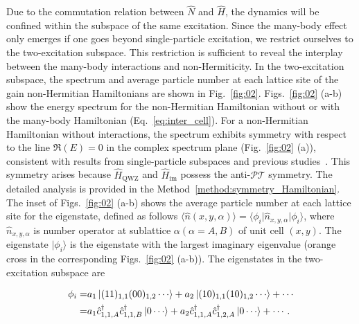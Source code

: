 \documentclass[longbibliography, aps, prx, amsmath, amssymb, amsfonts, twocolumn,superscriptaddress, footinbib]{revtex4-1}
\begin{document}
	Due to the commutation relation between $\hat{N}$ and $\hat{H}$, the dynamics will be confined within the subspace of the same excitation. Since the many-body effect only emerges if one goes beyond single-particle excitation, we restrict ourselves to the two-excitation subspace. This restriction is sufficient to reveal the interplay between the many-body interactions and non-Hermiticity. 
	In the two-excitation subspace, the spectrum and average particle number at each lattice site of the gain non-Hermitian Hamiltonians 
	are shown in Fig.~\ref{fig:02}.
	Figs.~\ref{fig:02} (a-b) show the energy spectrum
	for the non-Hermitian Hamiltonian without or with the many-body Hamiltonian (Eq.~\ref{eq:inter_cell}). 
    For a non-Hermitian Hamiltonian without interactions, the spectrum exhibits symmetry with respect to the line $\Re(E)=0$ in the complex spectrum plane (Fig.~\ref{fig:02} (a)), consistent with results from single-particle subspaces and previous studies~\cite{nakamura2023universal, ma2024non,schindler2023hermitian}. This symmetry arises because $\hat{H}_{\text{QWZ}}$ and $\hat{H}_{\text{im}}$ possess the anti-$\mathcal{PT}$ symmetry.
	The detailed analysis is provided in the Method~\ref{method:symmetry_Hamiltonian}.
	The inset of Figs.~\ref{fig:02} (a-b) shows the average particle number at each lattice site for the eigenstate, defined as follows $\langle \hat{n}(x,y,\alpha) \rangle = \langle \phi_i \vert \hat{n}_{x,y,\alpha} \vert \phi_i \rangle$,
	where 
	$\hat{n}_{x,y,\alpha}$ is number operator at sublattice $\alpha (\alpha=A,B)$ of unit cell $(x,y)$.
	The eigenstate $\vert \phi_i \rangle$ is the eigenstate with the largest imaginary eigenvalue (orange cross in the corresponding Figs.~\ref{fig:02} (a-b)). The eigenstates in the two-excitation subspace are
    \begin{small}
    \begin{equation}
		\begin{split}
			\phi_i =& a_1 \ket{(11)_{1,1}(00)_{1,2}\cdots} + a_2 \ket{(10)_{1,1}(10)_{1,2}\cdots} + \cdots\\
			=& a_1 \hat{c}_{1,1,A}^{\dagger}\hat{c}_{1,1,B}^{\dagger} \ket{0\cdots} + a_2 \hat{c}_{1,1,A}^{\dagger}\hat{c}_{1,2,A}^{\dagger} \ket{0\cdots} + \cdots.
		\end{split}\label{eq2}
	\end{equation}
    \end{small}
\end{document}
